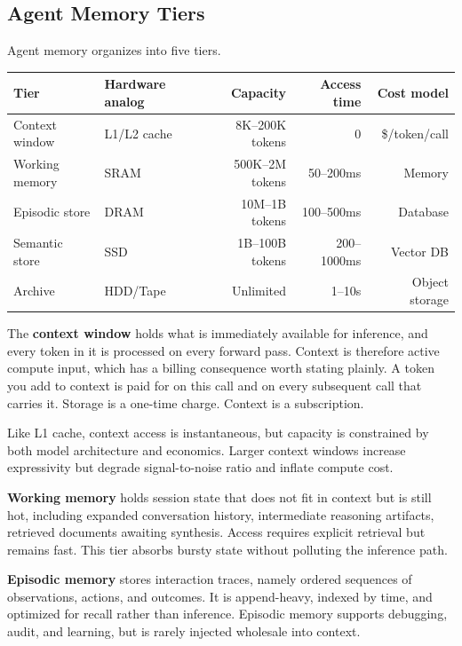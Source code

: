 \subsection{Agent Memory Tiers}

Agent memory organizes into five tiers.

\begin{center}
\begin{tabular}{llrrr}
\toprule
Tier & Hardware analog & Capacity & Access time & Cost model \\
\midrule
Context window & L1/L2 cache & 8K--200K tokens & 0 & \$/token/call \\
Working memory & SRAM & 500K--2M tokens & 50--200ms & Memory \\
Episodic store & DRAM & 10M--1B tokens & 100--500ms & Database \\
Semantic store & SSD & 1B--100B tokens & 200--1000ms & Vector DB \\
Archive & HDD/Tape & Unlimited & 1--10s & Object storage \\
\bottomrule
\end{tabular}
\end{center}

The \textbf{context window} holds what is immediately available for inference,
and every token in it is processed on every forward pass. Context is therefore
active compute input, which has a billing consequence worth stating plainly. A
token you add to context is paid for on this call and on every subsequent call
that carries it. Storage is a one-time charge. Context is a subscription.

Like L1 cache, context access is instantaneous, but capacity is constrained by both model architecture and economics. Larger context windows increase expressivity but degrade signal-to-noise ratio and inflate compute cost.

\textbf{Working memory} holds session state that does not fit in context but is still hot, including expanded conversation history, intermediate reasoning artifacts, retrieved documents awaiting synthesis. Access requires explicit retrieval but remains fast. This tier absorbs bursty state without polluting the inference path.

\textbf{Episodic memory} stores interaction traces, namely ordered sequences of observations, actions, and outcomes. It is append-heavy, indexed by time, and optimized for recall rather than inference. Episodic memory supports debugging, audit, and learning, but is rarely injected wholesale into context.

